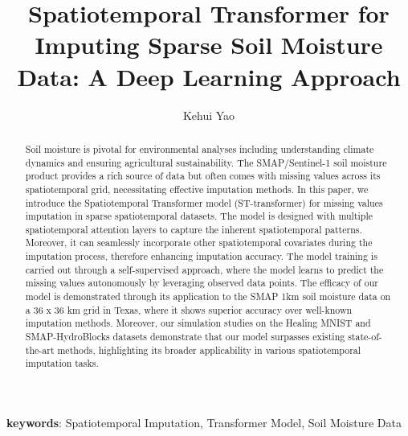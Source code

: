 \documentclass[11pt]{article}
\title{Spatiotemporal Transformer for Imputing Sparse Soil Moisture Data: A Deep Learning Approach}
\author[1]{Kehui Yao}
\affil[1]{Department of Statistics, University of Wisconsin-Madison}
\date{}
\begin{document}
\maketitle

\begin{abstract}
	Soil moisture is pivotal for environmental analyses including understanding climate dynamics and ensuring agricultural sustainability. The SMAP/Sentinel-1 soil moisture product provides a rich source of data but often comes with missing values across its spatiotemporal grid, necessitating effective imputation methods. In this paper, we introduce the Spatiotemporal Transformer model (ST-transformer) for missing values imputation in sparse spatiotemporal datasets. The model is designed with multiple spatiotemporal attention layers to capture the inherent spatiotemporal patterns. Moreover, it can seamlessly incorporate other spatiotemporal covariates during the imputation process, therefore enhancing imputation accuracy. The model training is carried out through a self-supervised approach, where the model learns to predict the missing values autonomously by leveraging observed data points. The efficacy of our model is demonstrated through its application to the SMAP 1km soil moisture data on a 36 x 36 km grid in Texas, where it shows superior accuracy over well-known imputation methods. Moreover, our simulation studies on the Healing MNIST and SMAP-HydroBlocks datasets demonstrate that our model surpasses existing state-of-the-art methods, highlighting its broader applicability in various spatiotemporal imputation tasks.	
\end{abstract}

\textbf{keywords}: Spatiotemporal Imputation, 
Transformer Model, Soil Moisture Data
\end{document}
